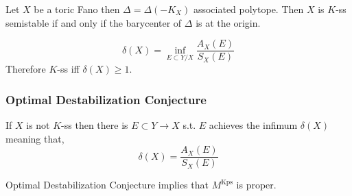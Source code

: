 \documentclass[12pt]{article}
\begin{document}
\begin{example}
Let $X$ be a toric Fano then $\Delta = \Delta(-K_X)$ associated polytope. Then $X$ is $K$-ss semistable if and only if the barycenter of $\Delta$ is at the origin. 
\end{example}

\begin{defn}
\[ \delta(X) = \inf_{E \subset Y / X} \frac{A_X(E)}{S_X(E)} \]
Therefore $K$-ss iff $\delta(X) \ge 1$.
\end{defn}

\subsubsection{Optimal Destabilization Conjecture}

If $X$ is not $K$-ss then there is $E \subset Y \to X$ s.t. $E$ achieves the infimum $\delta(X)$ meaning that,
\[ \delta(X) = \frac{A_X(E)}{S_X(E)} \]

\begin{thm}
Optimal Destabilization Conjecture implies that $M^{\text{Kps}}$ is proper.
\end{thm} 
\end{document}
